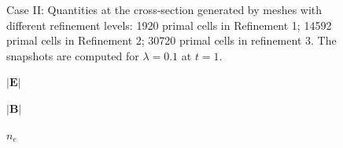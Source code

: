 \documentclass{article}
\begin{document}
\begin{figure}
\begin{minipage}{0.9\textwidth}
    \end{minipage}
    \caption{Case II: Quantities at the cross-section generated by meshes with different refinement levels: 1920 primal cells in Refinement 1; 14592 primal cells in Refinement 2; 30720 primal cells in refinement 3. The snapshots are computed for $\lambda = 0.1$ at $t = 1$.}
    \label{fig:grid_study_3d_clip_lambda-1e-1}
\end{figure}

\begin{figure}
    \centering
    \begin{minipage}{0.0\textwidth}
    \Large
    \vspace{0.4cm}
    $\mathbf{|E|}$
    
    \vspace{2.2cm}
    $\mathbf{|B|}$
    
    \vspace{2.2cm}
    $n_e$
    

\end{minipage}
\end{figure}
\end{document}
